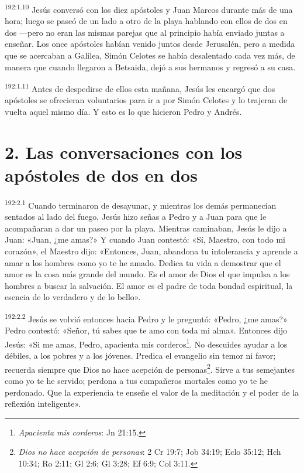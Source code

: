 \par 
\textsuperscript{192:1.10} Jesús conversó con los diez apóstoles y Juan Marcos durante más de una hora; luego se paseó de un lado a otro de la playa hablando con ellos de dos en dos ---pero no eran las mismas parejas que al principio había enviado juntas a enseñar. Los once apóstoles habían venido juntos desde Jerusalén, pero a medida que se acercaban a Galilea, Simón Celotes se había desalentado cada vez más, de manera que cuando llegaron a Betsaida, dejó a sus hermanos y regresó a su casa.

\par 
\textsuperscript{192:1.11} Antes de despedirse de ellos esta mañana, Jesús les encargó que dos apóstoles se ofrecieran voluntarios para ir a por Simón Celotes y lo trajeran de vuelta aquel mismo día. Y esto es lo que hicieron Pedro y Andrés.

\section*{2. Las conversaciones con los apóstoles de dos en dos}
\par 
\textsuperscript{192:2.1} Cuando terminaron de desayunar, y mientras los demás permanecían sentados al lado del fuego, Jesús hizo señas a Pedro y a Juan para que le acompañaran a dar un paseo por la playa. Mientras caminaban, Jesús le dijo a Juan: «Juan, ¿me amas?» Y cuando Juan contestó: «Sí, Maestro, con todo mi corazón», el Maestro dijo: «Entonces, Juan, abandona tu intolerancia y aprende a amar a los hombres como yo te he amado. Dedica tu vida a demostrar que el amor es la cosa más grande del mundo. Es el amor de Dios el que impulsa a los hombres a buscar la salvación. El amor es el padre de toda bondad espiritual, la esencia de lo verdadero y de lo bello».

\par 
\textsuperscript{192:2.2} Jesús se volvió entonces hacia Pedro y le preguntó: «Pedro, ¿me amas?» Pedro contestó: «Señor, tú sabes que te amo con toda mi alma». Entonces dijo Jesús: «Si me amas, Pedro, apacienta mis corderos\footnote{\textit{Apacienta mis corderos}: Jn 21:15.}. No descuides ayudar a los débiles, a los pobres y a los jóvenes. Predica el evangelio sin temor ni favor; recuerda siempre que Dios no hace acepción de personas\footnote{\textit{Dios no hace acepción de personas}: 2 Cr 19:7; Job 34:19; Eclo 35:12; Hch 10:34; Ro 2:11; Gl 2:6; Gl 3:28; Ef 6:9; Col 3:11.}. Sirve a tus semejantes como yo te he servido; perdona a tus compañeros mortales como yo te he perdonado. Que la experiencia te enseñe el valor de la meditación y el poder de la reflexión inteligente».

